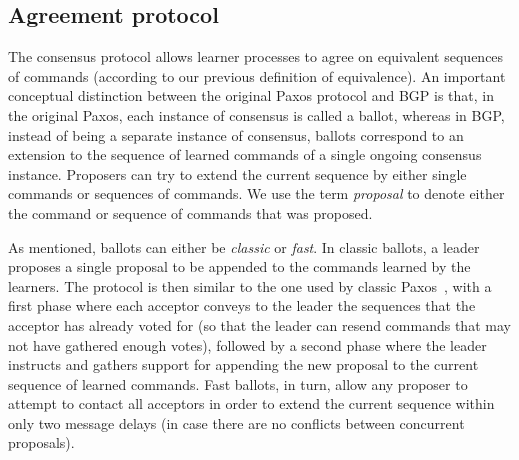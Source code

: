 \subsection{Agreement protocol} 

The consensus protocol allows learner processes to agree on equivalent sequences of commands (according to our previous definition of equivalence).
An important conceptual distinction between the original Paxos protocol and BGP is that, in the original Paxos, each instance of consensus is called a ballot, whereas in BGP, instead of being a separate instance of consensus, 
ballots correspond to an extension to the sequence of learned commands of a single ongoing consensus instance. Proposers can try to extend the current sequence by either single commands or sequences of commands. We use the term \textit{proposal} to denote either the command or sequence of commands that was proposed.

As mentioned, ballots can either be \textit{classic} or \textit{fast}. In classic ballots, a leader proposes a single proposal to be appended to the commands learned by the learners. The protocol is then similar to the one used by classic Paxos~\cite{Lam98}, with a first phase where each acceptor conveys to the leader the sequences that the acceptor has already voted for (so that the leader can resend commands that may not have gathered enough votes), followed by a second phase where the leader instructs and gathers support for appending the new proposal to the current sequence of learned commands. Fast ballots, in turn, allow any proposer to attempt to contact all acceptors in order to extend the current sequence within only two message delays (in case there are no conflicts between concurrent proposals).


